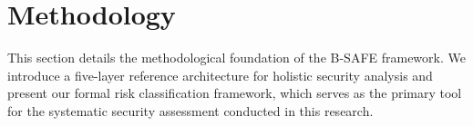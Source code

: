 \section{Methodology}
\label{sec:methodology}

This section details the methodological foundation of the B-SAFE framework. We introduce a five-layer reference architecture for holistic security analysis and present our formal risk classification framework, which serves as the primary tool for the systematic security assessment conducted in this research.

